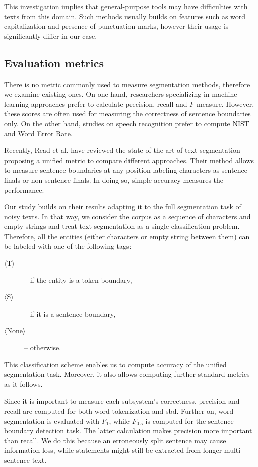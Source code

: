 This investigation implies that general-purpose tools may have difficulties with texts from this domain. 
Such methods usually builds on features such as word capitalization and presence of punctuation marks, however their usage is significantly differ in our case. 

\subsection{Evaluation metrics}
\label{sec:metric}

There is no metric commonly used to measure segmentation methods, therefore we examine existing ones.
On one hand, researchers specializing in machine learning approaches prefer to calculate precision, recall and $F$-measure. 
However, these scores are often used for measuring the correctness of sentence boundaries only.
On the other hand, studies on speech recognition prefer to compute NIST and Word Error Rate. 

Recently, Read et al. have reviewed \cite{read2012sentence} the state-of-the-art of text segmentation proposing a unified metric to compare different approaches. 
Their method allows to measure sentence boundaries at any position labeling characters as sentence-finals or non sentence-finals. 
In doing so, simple accuracy measures the performance. 

Our study builds on their results \cite{read2012sentence} adapting it to the full segmentation task of noisy texts. 
In that way, we consider the corpus as a sequence of characters and empty strings and treat text segmentation as a single classification problem. 
Therefore, all the entities (either characters or empty string between them) can be labeled with one of the following tags: 
\begin{description}
 \item[$\langle$T$\rangle$] --  if the entity is a token boundary,
 \item[$\langle$S$\rangle$] -- if it is a sentence boundary,
 \item[$\langle$None$\rangle$] -- otherwise.
\end{description}
This classification scheme enables us to compute accuracy of the unified segmentation task. 
Moreover, it also allows computing further standard metrics as it follows.

Since it is important to measure each subsystem's correctness, precision and recall are computed for both word tokenization and \acrshort{sbd}. 
Further on, word segmentation is evaluated with $F_1$, while $F_{0.5}$ is computed for the sentence boundary detection task. 
The latter calculation makes precision more important than recall. %
We do this because an erroneously split sentence may cause information loss\label{sec:loss}, while statements might still be extracted from longer multi-sentence text. 

